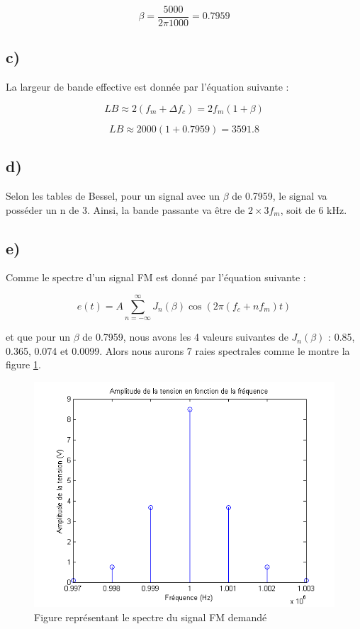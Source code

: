 \begin{equation}
	\beta = \frac{5000}{2\pi 1000} = 0.7959
\end{equation}

\subsection*{c)}
La largeur de bande effective est donnée par l'équation suivante :

\begin{equation}
	LB \approx 2(f_m + \Delta f_c)= 2f_m(1+\beta)
\end{equation}

\begin{equation}
	LB \approx  2000(1+0.7959) = 3591.8
\end{equation}


\subsection*{d)}
Selon les tables de Bessel, pour un signal avec un $\beta$ de 0.7959, le signal va posséder un n de 3. Ainsi, la bande passante va être de $2 \times 3f_m$, soit de 6 kHz.

\subsection*{e)}

Comme le spectre d'un signal FM est donné par l'équation suivante :

\begin{equation}
	e(t) = A \sum^\infty_{n=-\infty} J_n(\beta)\cos(2\pi(f_c+nf_m)t)
\end{equation}

et que pour un $\beta$ de 0.7959, nous avons les 4 valeurs suivantes de $J_n(\beta)$ : 0.85, 0.365, 0.074 et 0.0099. Alors nous aurons 7 raies spectrales comme le montre la figure \ref{schema1}.

\begin{figure}[htb]
\begin{center}
\includegraphics[scale=0.7]{no1e.png}
\caption{Figure représentant le spectre du signal FM demandé}
\label{schema1}
\end{center}
\end{figure}

